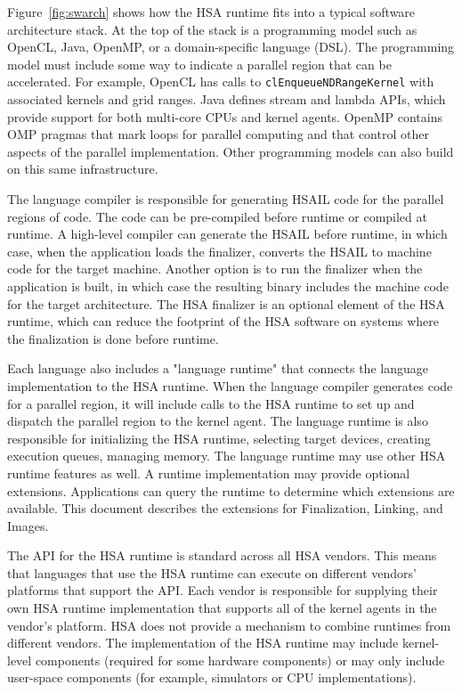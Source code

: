 \documentclass[final,oneside]{book}
\begin{document}
Figure~\ref{fig:swarch} shows how the HSA runtime fits into a typical software
architecture stack. At the top of the stack is a programming model such as
OpenCL\texttrademark, Java, OpenMP, or a domain-specific language (DSL). The
programming model must include some way to indicate a parallel region that can
be accelerated. For example, OpenCL has calls to \texttt{clEnqueueNDRangeKernel}
with associated kernels and grid ranges. Java defines stream and lambda APIs,
which provide support for both multi-core CPUs and kernel agents. OpenMP
contains OMP pragmas that mark loops for parallel computing and that control
other aspects of the parallel implementation. Other programming models can also
build on this same infrastructure.

The language compiler is responsible for generating HSAIL code for the parallel
regions of code. The code can be pre-compiled before runtime or compiled at
runtime. A high-level compiler can generate the HSAIL before runtime, in which
case, when the application loads the finalizer, converts the HSAIL to machine
code for the target machine. Another option is to run the finalizer when the
application is built, in which case the resulting binary includes the machine
code for the target architecture. The HSA finalizer is an optional element of
the HSA runtime, which can reduce the footprint of the HSA software on systems
where the finalization is done before runtime.

Each language also includes a "language runtime" that connects the language
implementation to the HSA runtime. When the language compiler generates code for
a parallel region, it will include calls to the HSA runtime to set up and
dispatch the parallel region to the kernel agent. The language runtime is also
responsible for initializing the HSA runtime, selecting target devices, creating
execution queues, managing memory. The language runtime may use other HSA
runtime features as well. A runtime implementation may provide optional
extensions. Applications can query the runtime to determine which extensions are
available. This document describes the extensions for Finalization, Linking, and
Images.

The API for the HSA runtime is standard across all HSA vendors. This means that
languages that use the HSA runtime can execute on different vendors' platforms
that support the API. Each vendor is responsible for supplying their own HSA
runtime implementation that supports all of the kernel agents in the vendor's
platform. HSA does not provide a mechanism to combine runtimes from different
vendors. The implementation of the HSA runtime may include kernel-level
components (required for some hardware components) or may only include
user-space components (for example, simulators or CPU implementations).
\end{document}
